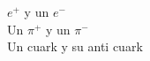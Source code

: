 \documentclass[preview]{standalone}
\begin{document}
\begin{center}
\begin{flushleft} $e^+$ y un $e^-$\\Un $\pi^+$ y un $\pi^-$\\Un cuark y su anti cuark\end{flushleft}
\end{center}
\end{document}
